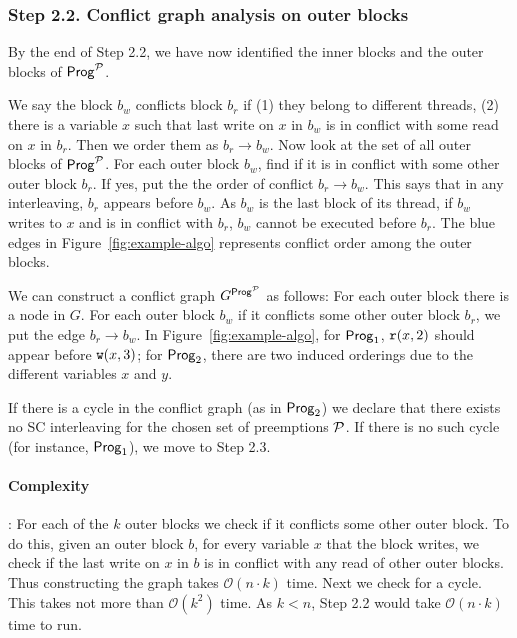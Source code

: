 \subsubsection*{Step 2.2. Conflict graph analysis on outer blocks}

By the end of Step 2.2, we have now identified the inner blocks and the outer blocks of $\mathsf{Prog}^{\mathcal{P}}$. 

We say the block $b_w$ conflicts block $b_r$ if (1) they belong to different threads, (2) there is a variable $x$ such that last write on $x$ in $b_w$ is in conflict with some read on $x$ in $b_r$. Then we order them as $b_r \to b_w$. Now look at the set of all outer blocks of $\mathsf{Prog}^{\mathcal{P}}$. For each outer block $b_w$, find if it is in conflict with some other outer block $b_r$. If yes, put the the order of conflict $b_r \to b_w$. This says that in any interleaving, $b_r$ appears before $b_w$. As $b_w$ is the last block of its thread, if $b_w$ writes to $x$ and is in conflict with $b_r$, $b_w$ cannot be executed before $b_r$. The blue edges in Figure~\ref{fig:example-algo} represents conflict order among the outer blocks. 

We can construct a conflict graph $G^{\mathsf{Prog}
^{\mathcal{P}}}$ as follows: For each outer block there is a node in $G$. For each outer block $b_w$ if it conflicts some other outer block $b_r$, we put the edge $b_r \to b_w$. In Figure~\ref{fig:example-algo},  for $\mathsf{Prog}_1$, $\mathtt{r}(x, 2)$ should appear before $\mathtt{w}(x, 3)$; for $\mathsf{Prog}_2$, there are two induced orderings due to the different variables $x$ and $y$.

If there is a cycle in the conflict graph (as in $\mathsf{Prog}_2$) we declare that there exists no SC interleaving for the chosen set of preemptions $\mathcal{P}$. If there is no such cycle (for instance, $\mathsf{Prog}_1$), we move to Step 2.3. 

\paragraph*{Complexity}: For each of the $k$ outer blocks we check if it conflicts some other outer block. To do this, given an outer block $b$, for every variable $x$ that the block writes, we check if the last write on $x$ in $b$ is in conflict with any read of other outer blocks. Thus constructing the graph takes $\mathcal{O}(n\cdot k)$ time. Next we check for a cycle. This takes not more than $\mathcal{O}(k^2)$ time. As $k< n$, Step 2.2 would take $\mathcal{O}(n\cdot k)$ time to run. 

